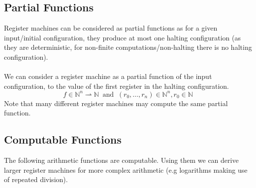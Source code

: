 \documentclass{report}
\begin{document}
        \subsection*{Partial Functions}
            Register machines can be considered as partial functions as for a given input/initial configuration, they produce at most one halting configuration (as they are deterministic, for non-finite computations/non-halting there is no halting configuration).
            \\
            \\ We can consider a register machine as a partial function of the input configuration, to the value of the first register in the halting configuration.
            \[f \in \mathbb{N}^n \rightharpoonup \mathbb{N} \ \text{  and  } \ (r_0, \dots, r_n) \in \mathbb{N}^n, r_0 \in \mathbb{N}\]
            Note that many different register machines may compute the same partial function.
        \subsection*{Computable Functions}
            The following arithmetic functions are computable. Using them we can derive larger register machines for more complex arithmetic (e.g logarithms making use of repeated division).
\end{document}
